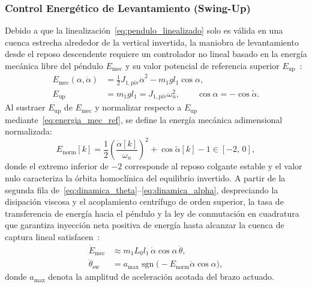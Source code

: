 \subsubsection{Control Energético de Levantamiento (Swing-Up)}
Debido a que la linealización~\eqref{eq:pendulo_linealizado} solo es válida en una cuenca estrecha alrededor de la vertical invertida, la maniobra de levantamiento desde el reposo descendente requiere un controlador no lineal basado en la energía mecánica libre del péndulo $E_{\text{mec}}$ y su valor potencial de referencia superior $E_{\text{up}}$~\cite{astrom2000,spong1995}:
\begin{equation}
    \begin{aligned}
        E_{\text{mec}}(\alpha,\dot{\alpha}) &= \frac{1}{2}J_{1,\text{piv}}\dot{\alpha}^2 - m_1 g l_1\cos\alpha, \\
        E_{\text{up}} &= m_1 g l_1 = J_{1,\text{piv}}\omega_n^2, \qquad \cos\alpha = -\cos\tilde{\alpha}.
    \end{aligned}
    \label{eq:energia_mec_ref}
\end{equation}
Al sustraer $E_{\text{up}}$ de $E_{\text{mec}}$ y normalizar respecto a $E_{\text{up}}$ mediante~\eqref{eq:energia_mec_ref}, se define la energía mecánica adimensional normalizada:
\begin{equation}
    E_{\text{norm}}[k] = \frac{1}{2}\left(\frac{\dot{\alpha}[k]}{\omega_n}\right)^2 + \cos\tilde{\alpha}[k] - 1 \in [-2,\, 0],
    \label{eq:energia_swingup}
\end{equation}
donde el extremo inferior de $-2$ corresponde al reposo colgante estable y el valor nulo caracteriza la órbita homoclínica del equilibrio invertido. A partir de la segunda fila de~\eqref{eq:dinamica_theta}--\eqref{eq:dinamica_alpha}, despreciando la disipación viscosa y el acoplamiento centrífugo de orden superior, la tasa de transferencia de energía hacia el péndulo y la ley de conmutación en cuadratura que garantiza inyección neta positiva de energía hasta alcanzar la cuenca de captura lineal satisfacen~\cite{astrom2000,spong1995}:
\begin{equation}
    \begin{aligned}
        \dot{E}_{\text{mec}} &\approx m_1 L_0 l_1\,\dot{\alpha}\cos\alpha\,\ddot{\theta}, \\
        \ddot{\theta}_{\text{sw}} &= a_{\max}\operatorname{sgn}\!\bigl(-E_{\text{norm}}\dot{\alpha}\cos\alpha\bigr),
    \end{aligned}
    \label{eq:energia_mec_tasa}
\end{equation}
donde $a_{\max}$ denota la amplitud de aceleración acotada del brazo actuado.

